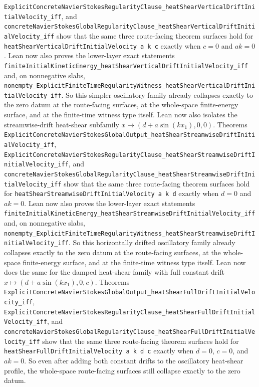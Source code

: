 \documentclass[11pt]{article}
\begin{document}
\texttt{ExplicitConcreteNavierStokesRegularityClause\_heatShearVerticalDriftInitialVelocity\_iff},
and
\texttt{concreteNavierStokesGlobalRegularityClause\_heatShearVerticalDriftInitialVelocity\_iff}
show that the same three route-facing theorem surfaces hold for
\texttt{heatShearVerticalDriftInitialVelocity a k c} exactly when
\(c = 0\) and \(a k = 0\).  Lean now also proves the lower-layer exact
statements
\texttt{finiteInitialKineticEnergy\_heatShearVerticalDriftInitialVelocity\_iff}
and, on nonnegative slabs,
\texttt{nonempty\_ExplicitFiniteTimeRegularityWitness\_heatShearVerticalDriftInitialVelocity\_iff}.
So this simpler oscillatory family already collapses exactly to the zero datum
at the route-facing surfaces, at the whole-space finite-energy surface, and at
the finite-time witness type itself.
Lean now also isolates the streamwise-drift heat-shear subfamily
\(x \mapsto (d + a \sin(k x_1), 0, 0)\).  Theorems
\texttt{ExplicitConcreteNavierStokesGlobalOutput\_heatShearStreamwiseDriftInitialVelocity\_iff},
\texttt{ExplicitConcreteNavierStokesRegularityClause\_heatShearStreamwiseDriftInitialVelocity\_iff},
and
\texttt{concreteNavierStokesGlobalRegularityClause\_heatShearStreamwiseDriftInitialVelocity\_iff}
show that the same three route-facing theorem surfaces hold for
\texttt{heatShearStreamwiseDriftInitialVelocity a k d} exactly when
\(d = 0\) and \(a k = 0\).  Lean now also proves the lower-layer exact
statements
\texttt{finiteInitialKineticEnergy\_heatShearStreamwiseDriftInitialVelocity\_iff}
and, on nonnegative slabs,
\texttt{nonempty\_ExplicitFiniteTimeRegularityWitness\_heatShearStreamwiseDriftInitialVelocity\_iff}.
So this horizontally drifted oscillatory family already collapses exactly to
the zero datum at the route-facing surfaces, at the whole-space finite-energy
surface, and at the finite-time witness type itself.
Lean now does the same for the damped heat-shear family with full constant
drift \(x \mapsto (d + a \sin(k x_1), 0, c)\).  Theorems
\texttt{ExplicitConcreteNavierStokesGlobalOutput\_heatShearFullDriftInitialVelocity\_iff},
\texttt{ExplicitConcreteNavierStokesRegularityClause\_heatShearFullDriftInitialVelocity\_iff},
and
\texttt{concreteNavierStokesGlobalRegularityClause\_heatShearFullDriftInitialVelocity\_iff}
show that the same three route-facing theorem surfaces hold for
\texttt{heatShearFullDriftInitialVelocity a k d c} exactly when
\(d = 0\), \(c = 0\), and \(a k = 0\).  So even after adding both constant
drifts to the oscillatory heat-shear profile, the whole-space route-facing
surfaces still collapse exactly to the zero datum.
\end{document}
